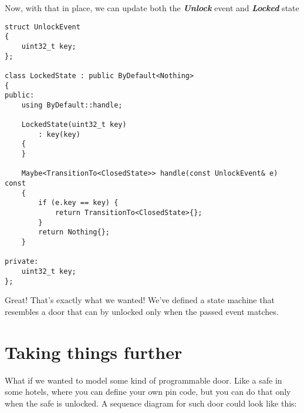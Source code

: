 \documentclass{article}[8pt]
\newcommand{\code}[1]{\textbf{\textit{#1}}}
\newcommand{\locked}{\code{Locked}}
\newcommand{\unlock}{\code{Unlock}}
\begin{document}
\bigskip
\inputminted[firstline=5]{c++}{../fsm/actions/Maybe.h}
\bigskip

Now, with that in place, we can update both the \unlock{} event and \locked{} state

\bigskip
\begin{verbatim}
struct UnlockEvent
{
    uint32_t key;
};

class LockedState : public ByDefault<Nothing>
{
public:
    using ByDefault::handle;

    LockedState(uint32_t key)
        : key(key)
    {
    }

    Maybe<TransitionTo<ClosedState>> handle(const UnlockEvent& e) const
    {
        if (e.key == key) {
            return TransitionTo<ClosedState>{};
        }
        return Nothing{};
    }

private:
    uint32_t key;
};
\end{verbatim}
\bigskip

Great! That's exactly what we wanted! We've defined a state machine that resembles a door that can by unlocked only when the passed event matches.

\section*{Taking things further}

What if we wanted to model some kind of programmable door. Like a safe in some hotels, where you can define your own pin code, but you can do that only when the safe is unlocked. A sequence diagram for such door could look like this:

\end{document}
